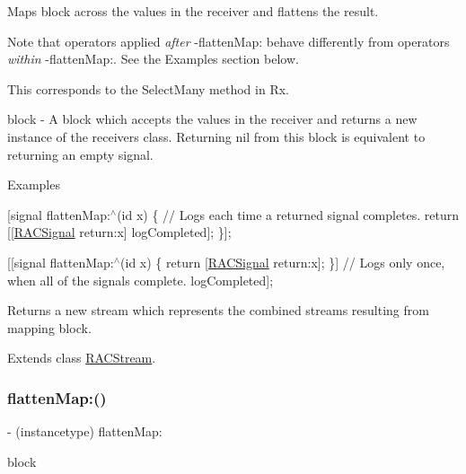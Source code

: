 Maps {\ttfamily block} across the values in the receiver and flattens the result.

Note that operators applied {\itshape after} -\/flatten\+Map\+: behave differently from operators {\itshape within} -\/flatten\+Map\+:. See the Examples section below.

This corresponds to the {\ttfamily Select\+Many} method in Rx.

block -\/ A block which accepts the values in the receiver and returns a new instance of the receiver\textquotesingle{}s class. Returning {\ttfamily nil} from this block is equivalent to returning an empty signal.

Examples

\mbox{[}signal flatten\+Map\+:$^\wedge$(id x) \{ // Logs each time a returned signal completes. return \mbox{[}\mbox{[}\mbox{\hyperlink{interface_r_a_c_signal}{R\+A\+C\+Signal}} return\+:x\mbox{]} log\+Completed\mbox{]}; \}\mbox{]};

\mbox{[}\mbox{[}signal flatten\+Map\+:$^\wedge$(id x) \{ return \mbox{[}\mbox{\hyperlink{interface_r_a_c_signal}{R\+A\+C\+Signal}} return\+:x\mbox{]}; \}\mbox{]} // Logs only once, when all of the signals complete. log\+Completed\mbox{]};

Returns a new stream which represents the combined streams resulting from mapping {\ttfamily block}. 

Extends class \mbox{\hyperlink{interface_r_a_c_stream_a2441b0306adc6ae2845219f8b116119a}{R\+A\+C\+Stream}}.

\mbox{\label{category_r_a_c_stream_07_operations_08_a2441b0306adc6ae2845219f8b116119a}} 
\subsubsection{\texorpdfstring{flatten\+Map\+:()}{flattenMap:()}\hspace{0.1cm}{\footnotesize\ttfamily [2/3]}}
{\footnotesize\ttfamily -\/ (instancetype) flatten\+Map\+: \begin{DoxyParamCaption}\item[{(\mbox{\hyperlink{interface_r_a_c_stream}{R\+A\+C\+Stream}} $\ast$($^\wedge$)(id value))}]{block }\end{DoxyParamCaption}}

